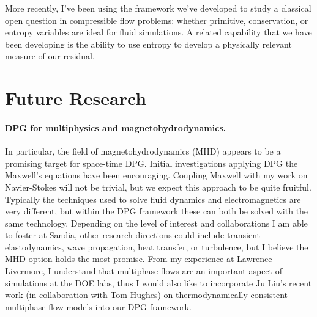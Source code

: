 \documentclass[letterpaper,12pt]{article}
\begin{document}
More recently, I've been using the framework we've developed to study a classical open question in compressible flow problems: 
whether primitive, conservation, or entropy variables are ideal for fluid simulations.
A related capability that we have been developing is the ability to use entropy to develop a physically relevant measure of our residual.

\section*{Future Research}
\paragraph{DPG for multiphysics and magnetohydrodynamics.}
In particular, the field of magnetohydrodynamics (MHD) appears to be a promising target for space-time DPG.
Initial investigations applying DPG the Maxwell's equations have been encouraging.
Coupling Maxwell with my work on Navier-Stokes will not be trivial, but we expect this approach to be quite fruitful.
Typically the techniques used to solve fluid dynamics and electromagnetics are very different, but within the DPG framework these can both be solved
with the same technology.
Depending on the level of interest and collaborations I am able to foster at Sandia, 
other research directions could include transient elastodynamics, wave propagation, heat transfer, or turbulence,
but I believe the MHD option holds the most promise.
From my experience at Lawrence Livermore, I understand that multiphase flows are an important aspect of 
simulations at the DOE labs, thus
I would also like to incorporate Ju Liu's recent work (in collaboration with Tom Hughes) on thermodynamically consistent multiphase flow models
into our DPG framework.
\end{document}
